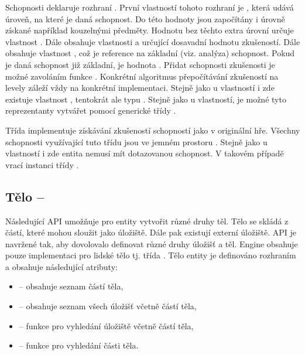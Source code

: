 Schopnosti deklaruje rozhraní . První vlastností tohoto rozhraní je , která udává úroveň,
na které je daná schopnost. Do této hodnoty jsou započítány i úrovně získané například kouzelnými předměty. Hodnotu
bez těchto extra úrovní určuje vlastnost . Dále obsahuje vlastnosti  a 
určující dosavadní hodnotu zkušeností. Dále obsahuje vlastnost , což je reference na základní (viz. analýza) schopnost. Pokud
je daná schopnost již základní, je hodnota . Přidat schopnosti zkušenosti je možné zavoláním funkce .
Konkrétní algoritmus přepočítávání zkušeností na levely záleží vždy  na konkrétní implementaci. Stejně jako u vlastností 
i zde existuje vlastnost , tentokrát ale typu . Stejně jako u vlastností, je možné tyto reprezentanty
vytvářet pomocí generické třídy . 

Třída  implementuje získávání zkušeností schopností jako v originální hře. Všechny schopnosti 
využívající tuto třídu jsou ve jemném prostoru . Stejně jako
u vlastností i zde entita nemusí mít dotazovanou schopnost. V takovém případě vrací instanci třídy .

\subsection{Tělo -- }

Následující API umožňuje pro entity vytvořit různé druhy těl.
Tělo se skládá z částí, které mohou sloužit jako úložiště. Dále pak existují externí
úložiště. API je navržené tak, aby dovolovalo definovat různé druhy úložišť a těl. 
Engine obsahuje pouze implementaci pro lidské tělo tj. třída .
Tělo entity je definováno rozhraním  a obsahuje následující atributy:

\begin{itemize}
\item {} -- obsahuje seznam částí těla,
\item {} -- obsahuje seznam všech úložišť včetně částí těla,
\item {} -- funkce pro vyhledání úložiště včetně částí těla,
\item {} -- funkce  pro vyhledání části těla. 
\end{itemize}

